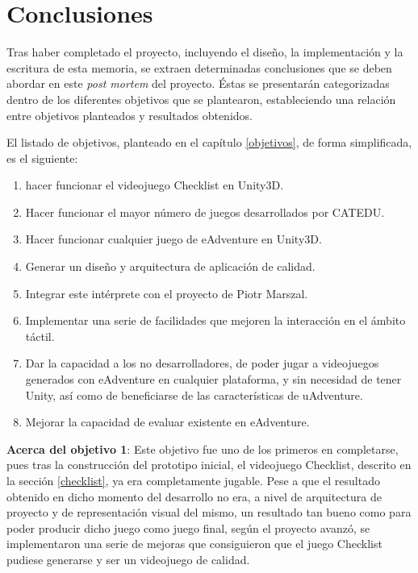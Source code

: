 \chapter{Conclusiones}
\label{conclusiones}

Tras haber completado el proyecto, incluyendo el diseño, la implementación y la escritura de esta memoria, se extraen determinadas conclusiones que se deben abordar en este \textit{post mortem} del proyecto. Éstas se presentarán categorizadas dentro de los diferentes objetivos que se plantearon, estableciendo una relación entre objetivos planteados y resultados obtenidos.

El listado de objetivos, planteado en el capítulo \ref{objetivos}, de forma simplificada, es el siguiente:

\begin{enumerate}
	\item hacer funcionar el videojuego Checklist en Unity3D.
	
	\item Hacer funcionar el mayor número de juegos desarrollados por CATEDU.
	
	\item Hacer funcionar cualquier juego de eAdventure en Unity3D.
	
	\item Generar un diseño y arquitectura de aplicación de calidad.
	
	\item Integrar este intérprete con el proyecto de Piotr Marszal.
	
	\item Implementar una serie de facilidades que mejoren la interacción en el ámbito táctil.
	
	\item Dar la capacidad a los no desarrolladores, de poder jugar a videojuegos generados con eAdventure en cualquier plataforma, y sin necesidad de tener Unity, así como de beneficiarse de las características de uAdventure.
	
	\item Mejorar la capacidad de evaluar existente en eAdventure.
\end{enumerate}

\textbf{Acerca del objetivo 1}: Este objetivo fue uno de los primeros en completarse, pues tras la construcción del prototipo inicial, el videojuego Checklist, descrito en la sección \ref{checklist}, ya era completamente jugable. Pese a que el resultado obtenido en dicho momento del desarrollo no era, a nivel de arquitectura de proyecto y de representación visual del mismo, un resultado tan bueno como para poder producir dicho juego como juego final, según el proyecto avanzó, se implementaron una serie de mejoras que consiguieron que el juego Checklist pudiese generarse y ser un videojuego de calidad.

